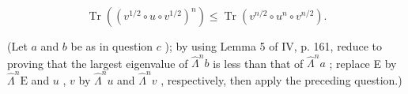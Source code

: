 \[
\operatorname{Tr} \left(\left(v ^ {1 / 2} \circ u \circ v ^ {1 / 2}\right) ^ {n}\right) \leqslant \operatorname{Tr} \left(v ^ {n / 2} \circ u ^ {n} \circ v ^ {n / 2}\right).
\]

(Let \(a\) and \(b\) be as in question \(c\) ); by using Lemma 5 of IV, p. 161, reduce to proving that the largest eigenvalue of \(\widehat{\Lambda}^{n}b\) is less than that of \(\widehat{\Lambda}^{n}a\) ; replace E by \(\widehat{\Lambda}^{n}\mathrm{E}\) and \(u\) , \(v\) by \(\widehat{\Lambda}^{n}u\) and \(\widehat{\Lambda}^{n}v\) , respectively, then apply the preceding question.)